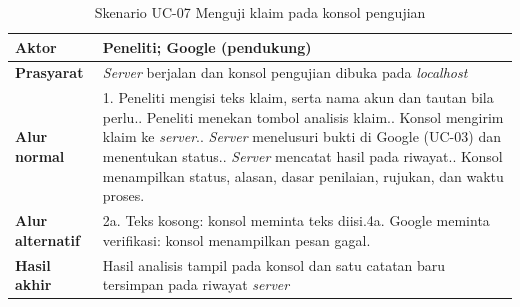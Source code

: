 \documentclass[12pt,a4paper,twoside]{report}
\begin{document}
\begin{table}[H]
  \centering
  \caption{Skenario UC-07 Menguji klaim pada konsol pengujian}
  \label{tab:skn7}
  \begin{spacing}{1.0}
  \normalsize
  \setlength{\extrarowheight}{2pt}
  \begin{tabular}{|R{3.0cm}|R{9.6cm}|}
    \hline
    \textbf{Aktor} & Peneliti; Google (pendukung) \\ \hline
    \textbf{Prasyarat} & \textit{Server} berjalan dan konsol pengujian dibuka pada \textit{localhost} \\ \hline
    \textbf{Alur normal} & 1. Peneliti mengisi teks klaim, serta nama akun dan tautan bila perlu.. Peneliti menekan tombol analisis klaim.. Konsol mengirim klaim ke \textit{server}.. \textit{Server} menelusuri bukti di Google (UC-03) dan menentukan status.. \textit{Server} mencatat hasil pada riwayat.. Konsol menampilkan status, alasan, dasar penilaian, rujukan, dan waktu proses. \\ \hline
    \textbf{Alur alternatif} & 2a. Teks kosong: konsol meminta teks diisi.\newline 4a. Google meminta verifikasi: konsol menampilkan pesan gagal. \\ \hline
    \textbf{Hasil akhir} & Hasil analisis tampil pada konsol dan satu catatan baru tersimpan pada riwayat \textit{server} \\ \hline
  \end{tabular}
  \end{spacing}
\end{table}
\end{document}

